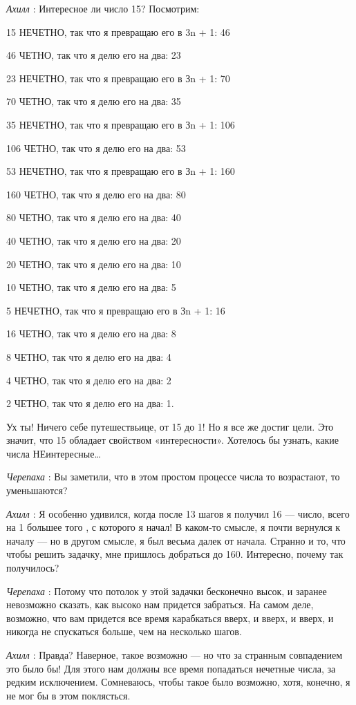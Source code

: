 \documentclass[../main.tex]{subfiles}
\begin{document}
\begin{dialogue}
\emph{Ахилл} : Интересное ли число 15? Посмотрим:

15 НЕЧЕТНО, так что я превращаю его в 3n + 1: 46

46 ЧЕТНО, так что я делю его на два: 23

23 НЕЧЕТНО, так что я превращаю его в Зn + 1: 70

70 ЧЕТНО, так что я делю его на два: 35

35 НЕЧЕТНО, так что я превращаю его в Зn + 1: 106

106 ЧЕТНО, так что я делю его на два: 53

53 НЕЧЕТНО, так что я превращаю его в Зn + 1: 160

160 ЧЕТНО, так что я делю его на два: 80

80 ЧЕТНО, так что я делю его на два: 40

40 ЧЕТНО, так что я делю его на два: 20

20 ЧЕТНО, так что я делю его на два: 10

10 ЧЕТНО, так что я делю его на два: 5

5 НЕЧЕТНО, так что я превращаю его в Зn + 1: 16

16 ЧЕТНО, так что я делю его на два: 8

8 ЧЕТНО, так что я делю его на два: 4

4 ЧЕТНО, так что я делю его на два: 2

2 ЧЕТНО, так что я делю его на два: 1.

Ух ты! Ничего себе путешествьице, от 15 до 1! Но я все же достиг цели. Это значит, что 15 обладает свойством «интересности». Хотелось бы узнать, какие числа НЕинтересные\ldots{}

\emph{Черепаха} : Вы заметили, что в этом простом процессе числа то возрастают, то уменьшаются?

\emph{Ахилл} : Я особенно удивился, когда после 13 шагов я получил 16 --- число, всего на 1 большее того , с которого я начал! В каком-то смысле, я почти вернулся к началу --- но в другом смысле, я был весьма далек от начала. Странно и то, что чтобы решить задачку, мне пришлось добраться до 160. Интересно, почему так получилось?

\emph{Черепаха} : Потому что потолок у этой задачки бесконечно высок, и заранее невозможно сказать, как высоко нам придется забраться. На самом деле, возможно, что вам придется все время карабкаться вверх, и вверх, и вверх, и никогда не спускаться больше, чем на несколько шагов.

\emph{Ахилл} : Правда? Наверное, такое возможно --- но что за странным совпадением это было бы! Для этого нам должны все время попадаться нечетные числа, за редким исключением. Сомневаюсь, чтобы такое было возможно, хотя, конечно, я не мог бы в этом поклясться.


\end{dialogue}
\end{document}
